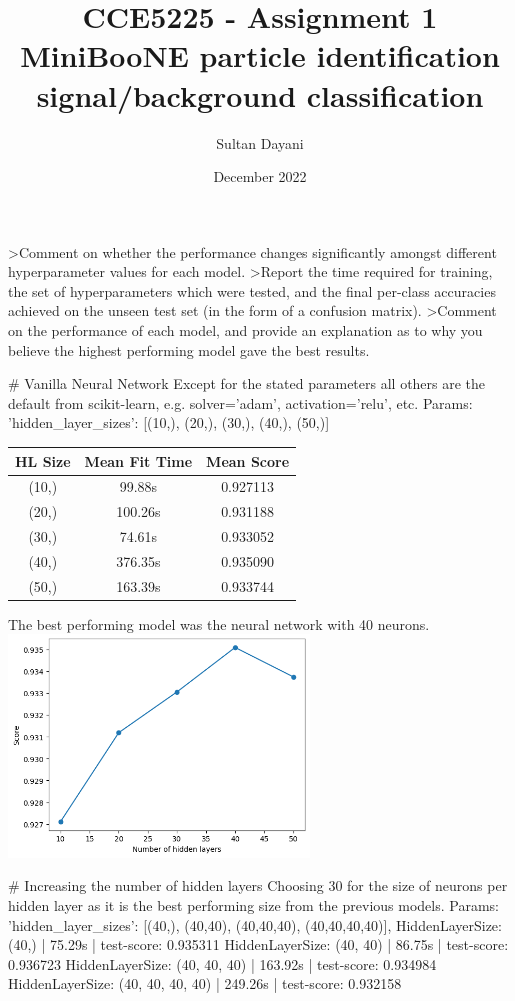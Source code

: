 \documentclass[12pt, letterpaper]{article}
\title{CCE5225 - Assignment 1 \\
\large MiniBooNE particle identification \\ signal/background classification}
\author{Sultan Dayani}
\date{December 2022}
\begin{document}
\maketitle
\pagebreak

\textgreater{Comment on whether the performance changes significantly amongst different hyperparameter values for each model.}
\textgreater{Report the time required for training, the set of hyperparameters which were tested, and the final per-class accuracies achieved on the unseen test set (in the form of a confusion matrix).}
\textgreater{Comment on the performance of each model, and provide an explanation as to why you believe the highest performing model gave the best results.}

# Vanilla Neural Network
Except for the stated parameters all others are the default from scikit-learn, e.g. solver='adam', activation='relu', etc.
Params: 'hidden_layer_sizes': [(10,), (20,), (30,), (40,), (50,)]
\begin{tabular}{|c c c|}
\hline
HL Size & Mean Fit Time & Mean Score \\ [0.5ex] 
\hline
(10,) & 99.88s & 0.927113 \\
\hline
(20,) & 100.26s & 0.931188 \\
\hline
(30,) & 74.61s & 0.933052 \\
\hline
(40,) & 376.35s & 0.935090 \\
\hline
(50,) & 163.39s & 0.933744 \\ 
\hline
\end{tabular}
The best performing model was the neural network with 40 neurons.
\includegraphics[width=0.6\textwidth]{1hiddenlayer_scores.png}

# Increasing the number of hidden layers
Choosing 30 for the size of neurons per hidden layer as it is the best performing size from the previous models.
Params: 'hidden_layer_sizes': [(40,), (40,40), (40,40,40), (40,40,40,40)],
HiddenLayerSize: (40,) | 75.29s | test-score: 0.935311
HiddenLayerSize: (40, 40) | 86.75s | test-score: 0.936723
HiddenLayerSize: (40, 40, 40) | 163.92s | test-score: 0.934984
HiddenLayerSize: (40, 40, 40, 40) | 249.26s | test-score: 0.932158
\end{document}
